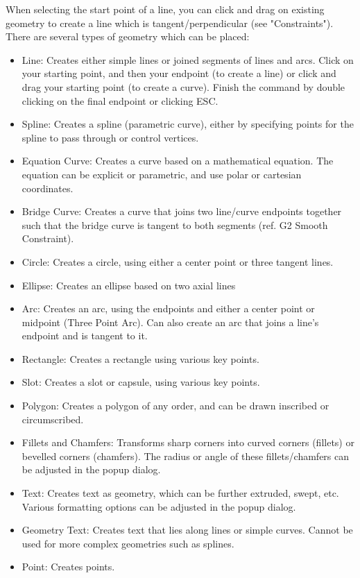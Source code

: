 When selecting the start point of a line, you can click and drag on existing geometry to create a line which is tangent/perpendicular (see "Constraints"). There are several types of geometry which can be placed:

\begin{itemize}
\item Line: Creates either simple lines or joined segments of lines and arcs. Click on your starting point, and then your endpoint (to create a line) or click and drag your starting point (to create a curve). Finish the command by double clicking on the final endpoint or clicking ESC.
\item Spline: Creates a spline (parametric curve), either by specifying points for the spline to pass through or control vertices. 
\item Equation Curve: Creates a curve based on a mathematical equation. The equation can be explicit or parametric, and use polar or cartesian coordinates.
\item Bridge Curve: Creates a curve that joins two line/curve endpoints together such that the bridge curve is tangent to both segments (ref. G2 Smooth Constraint).
\item Circle: Creates a circle, using either a center point or three tangent lines.
\item Ellipse: Creates an ellipse based on two axial lines
\item Arc: Creates an arc, using the endpoints and either a center point or midpoint (Three Point Arc). Can also create an arc that joins a line's endpoint and is tangent to it.
\item Rectangle: Creates a rectangle using various key points.
\item Slot: Creates a slot or capsule, using various key points.
\item Polygon: Creates a polygon of any order, and can be drawn inscribed or circumscribed.
\item Fillets and Chamfers: Transforms sharp corners into curved corners (fillets) or bevelled corners (chamfers). The radius or angle of these fillets/chamfers can be adjusted in the popup dialog.
\item Text: Creates text as geometry, which can be further extruded, swept, etc. Various formatting options can be adjusted in the popup dialog.
\item Geometry Text: Creates text that lies along lines or simple curves. Cannot be used for more complex geometries such as splines.
\item Point: Creates points.

\end{itemize}

